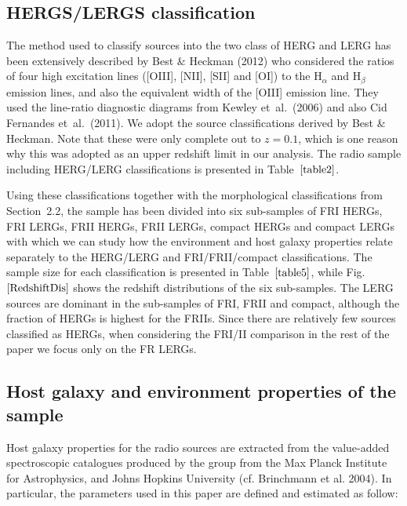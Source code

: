 \documentclass[usenatbib]{mn2e}
\begin{document}
\subsection {HERGS/LERGS classification}

The method used to classify sources into the two class of HERG and LERG
has been extensively described by Best \& Heckman (2012) who considered
the ratios of four high excitation lines ([OIII], [NII], [SII] and [OI])
to the H$_{\alpha}$ and H$_{\beta}$ emission lines, and also the
equivalent width of the [OIII] emission line. They used the line-ratio
diagnostic diagrams from Kewley et~al.\ (2006) and also Cid Fernandes
et~al.\ (2011). We adopt the source classifications derived by Best \&
Heckman. Note that these were only complete out to $z=0.1$, which is one
reason why this was adopted as an upper redshift limit in our analysis.
The radio sample including HERG/LERG classifications is presented in
Table~$\ref{table2}$.

Using these classifications together with the morphological classifications from
Section~2.2, the sample has been divided into six sub-samples of FRI
HERGs, FRI LERGs, FRII HERGs, FRII LERGs, compact HERGs and compact LERGs with which we can study how
the environment and host galaxy properties relate separately to the
HERG/LERG and FRI/FRII/compact classifications. The sample size for each
classification is presented in Table~$\ref{table5}$, while Fig.~$\ref{RedshiftDis}$ shows
the redshift distributions of the six sub-samples. The LERG sources are
dominant in the sub-samples of FRI, FRII and compact, although the fraction of
HERGs is highest for the FRIIs. Since there are relatively
few sources classified as HERGs, when considering the FRI/II comparison in
the rest of the paper we focus only on the FR LERGs.

\subsection {Host galaxy and environment properties of the sample}

Host galaxy properties for the radio sources are extracted from the
value-added spectroscopic catalogues produced by the group from the Max
Planck Institute for Astrophysics, and Johns Hopkins University (cf. Brinchmann et al. 2004).
 In particular, the parameters used in this paper
are defined and estimated as follow:
\end{document}
